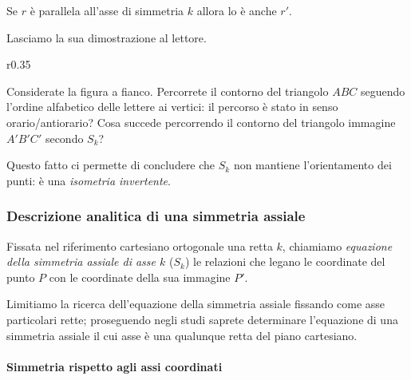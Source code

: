 \begin{teorema}\label{teo:8.5}
Se $r$ è parallela all'asse di simmetria $k$ allora lo è anche $r'$.
\end{teorema}

Lasciamo la sua dimostrazione al lettore.

\setlength{\intextsep}{3pt plus 2.0pt minus 2.0pt}
\begin{wrapfigure}{r}{0.35\textwidth}
	\centering
\end{wrapfigure}
Considerate la figura a fianco. Percorrete il contorno del triangolo 
$ABC$ seguendo l'ordine alfabetico delle lettere ai vertici: il 
percorso è stato in senso orario/antiorario? Cosa succede percorrendo 
il contorno del triangolo immagine $A'B'C'$ secondo $S_k$?

Questo fatto ci permette di concludere che $S_k$ non mantiene 
l'orientamento dei punti: è una \emph{isometria invertente}.

\subsubsection{Descrizione analitica di una simmetria assiale}

\begin{definizione}
Fissata nel riferimento cartesiano ortogonale una retta $k$, 
chiamiamo \emph{equazione della simmetria assiale di asse $k$} ($S_k$) 
le relazioni che legano le coordinate del punto $P$ con le coordinate 
della sua immagine $P'$.
\end{definizione}

Limitiamo la ricerca dell'equazione della simmetria assiale fissando 
come asse particolari rette; proseguendo negli studi saprete 
determinare l'equazione di una simmetria assiale il cui asse è una 
qualunque retta del piano cartesiano.

\paragraph{Simmetria rispetto agli assi coordinati}
~

